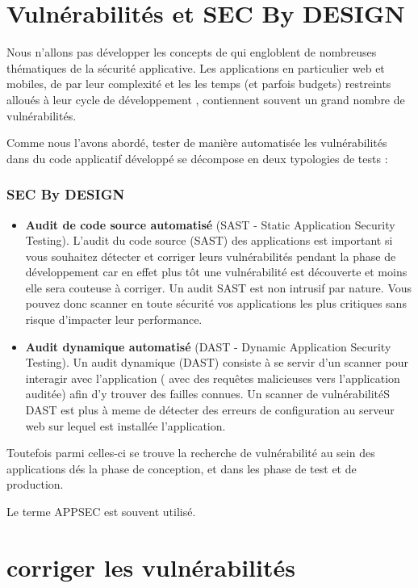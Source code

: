
\section{Vulnérabilités et SEC By DESIGN}

Nous n'allons pas développer les concepts de  qui  engloblent de nombreuses thématiques de la sécurité applicative.
Les applications en particulier web et mobiles, de par leur complexité et les les temps (et parfois budgets) restreints alloués à leur cycle de développement , contiennent souvent un grand nombre de vulnérabilités.

Comme nous l'avons abordé, tester de manière automatisée les vulnérabilités dans du code applicatif développé se décompose en deux typologies de tests :

\begin{frame}
\frametitle<presentation>{SEC By DESIGN}
\begin{itemize}
  \item  \textbf{Audit de code source automatisé} (SAST - Static Application Security Testing). L’audit du code source (SAST) des applications est important si vous souhaitez détecter et corriger leurs vulnérabilités pendant la phase de développement car en effet plus tôt une vulnérabilité est découverte et moins elle sera couteuse à corriger.
Un audit SAST est non intrusif par nature. Vous pouvez donc scanner en toute sécurité vos applications les plus critiques sans risque d’impacter leur performance.
  \item   \textbf{Audit dynamique automatisé }(DAST - Dynamic Application Security Testing). Un audit dynamique (DAST) consiste à se servir d’un scanner pour interagir avec l’application ( avec des requêtes malicieuses vers l’application auditée)  afin d’y trouver des failles connues.
Un scanner de vulnérabilitéS DAST est plus à meme de détecter des erreurs de configuration au serveur web sur lequel est installée l’application.

\end{itemize}
\end{frame}

Toutefois parmi celles-ci se trouve la recherche de vulnérabilité au sein des applications dés la phase de conception, et dans les phase de test et de production.

Le terme APPSEC est souvent utilisé.  

\section{corriger les vulnérabilités}

